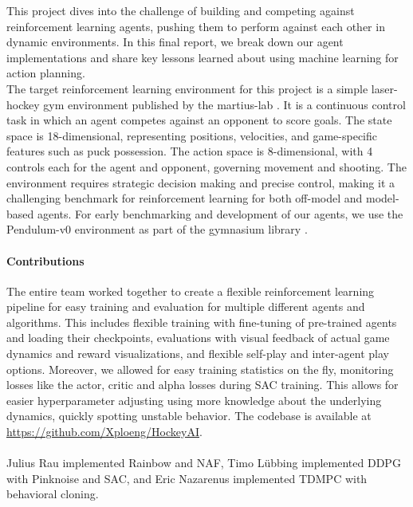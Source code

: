 This project dives into the challenge of building and competing against reinforcement learning agents, pushing them to perform against each other in dynamic environments. In this final report, we break down our agent implementations and share key lessons learned about using machine learning for action planning.\\
The target reinforcement learning environment for this project is a simple laser-hockey gym environment published by the martius-lab \cite{hockey_GitHub}. It is a continuous control task in which an agent competes against an opponent to score goals. The state space is 18-dimensional, representing positions, velocities, and game-specific features such as puck possession. The action space is 8-dimensional, with 4 controls each for the agent and opponent, governing movement and shooting. The environment requires strategic decision making and precise control, making it a challenging benchmark for reinforcement learning for both off-model and model-based agents. For early benchmarking and development of our agents, we use the Pendulum-v0 environment as part of the gymnasium library \cite{towers2024gymnasiumstandardinterfacereinforcement}.

\paragraph{Contributions}
The entire team worked together to create a flexible reinforcement learning pipeline for easy training and evaluation for multiple different agents and algorithms. This includes flexible training with fine-tuning of pre-trained agents and loading their checkpoints, evaluations with visual feedback of actual game dynamics and reward visualizations, and flexible self-play and inter-agent play options. Moreover, we allowed for easy training statistics on the fly, monitoring losses like the actor, critic and alpha losses during SAC training. This allows for easier hyperparameter adjusting using more knowledge about the underlying dynamics, quickly spotting unstable behavior. The codebase is available at \hyperlink{https://github.com/Xploeng/HockeyAI}{https://github.com/Xploeng/HockeyAI}.\\\\
Julius Rau implemented Rainbow and NAF, Timo Lübbing implemented DDPG with Pinknoise and SAC, and Eric Nazarenus implemented TDMPC with behavioral cloning.